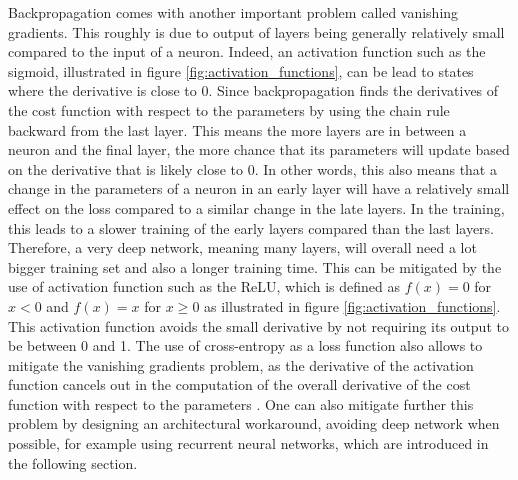 Backpropagation comes with another important problem called vanishing gradients. This roughly is due to output of layers being generally relatively small compared to the input of a neuron. Indeed, an activation function such as the sigmoid, illustrated in figure \ref{fig:activation_functions}, can be lead to states where the derivative is close to 0. Since backpropagation finds the derivatives of the cost function with respect to the parameters by using the chain rule backward from the last layer. This means the more layers are in between a neuron and the final layer, the more chance that its parameters will update based on the derivative that is likely close to 0. In other words, this also means that a change in the parameters of a neuron in an early layer will have a relatively small effect on the loss compared to a similar change in the late layers. In the training, this leads to a slower training of the early layers compared than the last layers. Therefore, a very deep network, meaning many layers, will overall need a lot bigger training set and also a longer training time. This can be mitigated by the use of activation function such as the ReLU, which is defined as $f(x)=0$ for $x < 0$ and $f(x)=x$ for $x \geq 0$ as illustrated in figure \ref{fig:activation_functions}. This activation function avoids the small derivative by not requiring its output to be between 0 and 1. The use of cross-entropy as a loss function also allows to mitigate the vanishing gradients problem, as the derivative of the activation function cancels out in the computation of the overall derivative of the cost function with respect to the parameters \cite{NN_book}. One can also mitigate further this problem by designing an architectural workaround, avoiding deep network when possible, for example using recurrent neural networks, which are introduced in the following section.

